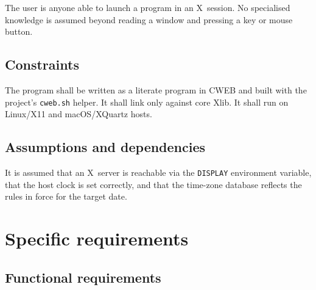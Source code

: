\documentclass[12pt]{article}
\newcommand{\code}[1]{\texttt{#1}}
\begin{document}
The user is anyone able to launch a program in an X~session.  No
specialised knowledge is assumed beyond reading a window and pressing a
key or mouse button.

\subsection{Constraints}

The program shall be written as a literate program in CWEB and built with
the project's \code{cweb.sh} helper.  It shall link only against core
Xlib.  It shall run on Linux/X11 and macOS/XQuartz hosts.

\subsection{Assumptions and dependencies}

It is assumed that an X~server is reachable via the \code{DISPLAY}
environment variable, that the host clock is set correctly, and that the
time-zone database reflects the rules in force for the target date.

\section{Specific requirements}

\subsection{Functional requirements}
\end{document}
